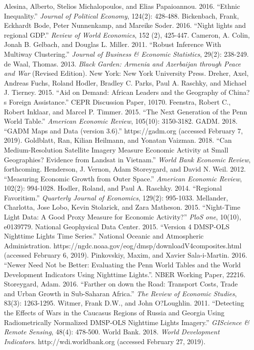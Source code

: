 \documentclass[12pt,a4paper]{article}%
\begin{document}
\begin{thebibliography}{99}                                                                                                %
\bibitem{} Alesina, Alberto, Stelios Michalopoulos, and Elias Papaioannou. 2016. ``Ethnic Inequality.'' \textit{Journal of Political Economy}, 124(2): 428-488.
\bibitem{} Bickenbach, Frank, Eckhardt Bode, Peter Nunnenkamp, and Mareike Soder. 2016. ``Night lights and regional GDP.'' \textit{Review of World Economics}, 152 (2), 425-447.                                                                                         
\bibitem{} Cameron, A. Colin, Jonah B. Gelbach, and Douglas L. Miller. 2011. ``Robust Inference With Multiway Clustering.'' \textit{Journal of Business \& Economic Statistics}, 29(2): 238-249.
\bibitem{} de Waal, Thomas. 2013. \textit{Black Garden: Armenia and Azerbaijan through Peace and War} (Revised Edition). New York: New York University Press.
\bibitem{} Dreher, Axel, Andreas Fuchs, Roland Hodler, Bradley C. Parks, Paul A. Raschky, and Michael J. Tierney. 2015. ``Aid on Demand: African Leaders and the Geography of China?s Foreign Assistance.'' CEPR Discussion Paper, 10170.
\bibitem{} Feenstra, Robert C., Robert Inklaar, and Marcel P. Timmer. 2015. ``The Next Generation of the Penn World Table.'' \textit{American Economic Review}, 105(10): 3150-3182.
\bibitem{} GADM. 2018. ``GADM Maps and Data (version 3.6).'' https://gadm.org (accessed February 7, 2019).
\bibitem{} Goldblatt, Ran, Kilian Heilmann, and Yonatan Vaizman. 2018. ``Can Medium-Resolution Satellite Imagery Measure Economic Activity at Small Geographies? Evidence from Landsat in Vietnam.'' \textit{World Bank Economic Review}, forthcoming.
\bibitem{} Henderson, J. Vernon, Adam Storeygard, and David N. Weil. 2012. ``Measuring Economic Growth from Outer Space.'' \textit{American Economic Review}, 102(2): 994-1028.
\bibitem{} Hodler, Roland, and Paul A. Raschky. 2014. ``Regional Favoritism.'' \textit{Quarterly Journal of Economics}, 129(2): 995-1033.
\bibitem{} Mellander, Charlotta, Jose Lobo, Kevin Stolarick, and Zara Matheson. 2015. ``Night-Time Light Data: A Good Proxy Measure for Economic Activity?'' \textit{PloS one}, 10(10), e0139779.
\bibitem{} National Geophysical Data Center. 2015. ``Version 4 DMSP-OLS Nighttime Lights Time Series.'' National Oceanic and Atmospheric Administration. https://ngdc.noaa.gov/eog/dmsp/downloadV4composites.html (accessed February 6, 2019).
\bibitem{} Pinkovskiy, Maxim, and Xavier Sala-i-Martin. 2016. ``Newer Need Not be Better: Evaluating the Penn World Tables and the World Development Indicators Using Nighttime Lights.''. NBER Working Paper, 22216.
\bibitem{} Storeygard, Adam. 2016. ``Farther on down the Road: Transport Costs, Trade and Urban Growth in Sub-Saharan Africa.'' \textit{The Review of Economic Studies}, 83(3): 1263-1295.
\bibitem{} Witmer, Frank D.W., and John O?Loughlin. 2011. ``Detecting the Effects of Wars in the Caucasus Regions of Russia and Georgia Using Radiometrically Normalized DMSP-OLS Nighttime Lights Imagery.'' \textit{GIScience \& Remote Sensing}, 48(4): 478-500.
\bibitem{} World Bank. 2018. \textit{World Development Indicators}. http://wdi.worldbank.org (accessed February 27, 2019).
\end{thebibliography}
\end{document}
